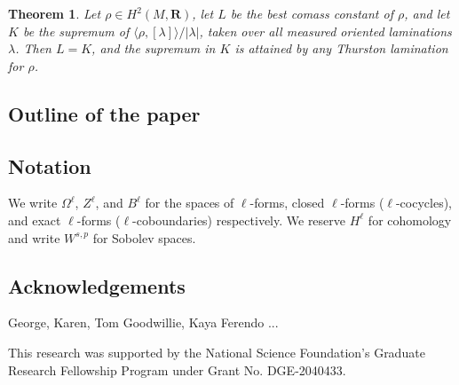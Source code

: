 \documentclass[reqno,11pt]{amsart}
\newcommand{\RR}{\mathbf{R}}
\newtheorem{mainthm}{Theorem}
\theoremstyle{definition}
\numberwithin{equation}{section}
\begin{document}
\begin{mainthm}
Let $\rho \in H^2(M, \RR)$, let $L$ be the best comass constant of $\rho$, and let $K$ be the supremum of $\langle \rho, [\lambda]\rangle/|\lambda|$, taken over all measured oriented laminations $\lambda$.
Then $L = K$, and the supremum in $K$ is attained by any Thurston lamination for $\rho$.
\end{mainthm}

\subsection{Outline of the paper}

\subsection{Notation}
We write $\Omega^\ell$, $Z^\ell$, and $B^\ell$ for the spaces of $\ell$-forms, closed $\ell$-forms ($\ell$-cocycles), and exact $\ell$-forms ($\ell$-coboundaries) respectively.
We reserve $H^\ell$ for cohomology and write $W^{s, p}$ for Sobolev spaces.
 
\subsection{Acknowledgements}
George, Karen, Tom Goodwillie, Kaya Ferendo ...

This research was supported by the National Science Foundation's Graduate Research Fellowship Program under Grant No. DGE-2040433.


\end{document}
